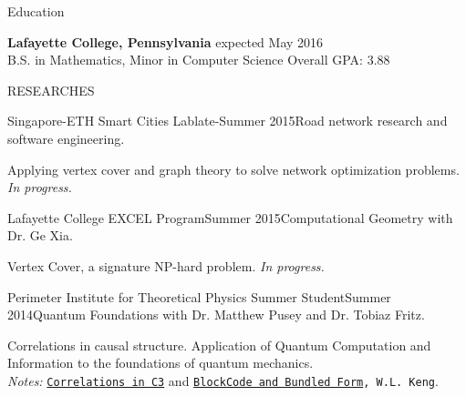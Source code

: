 \documentclass{resume} %
\begin{document}
\begin{rSection}{Education}

{\bf Lafayette College, Pennsylvania} \hfill expected May 2016\\ 
B.S. in Mathematics, Minor in Computer Science \hfill Overall GPA: 3.88
\end{rSection}


\begin{rSection}{RESEARCHES}

\begin{rSubsection}{Singapore-ETH Smart Cities Lab}{late-Summer 2015}{Road network research and software engineering.}{}
\item Applying vertex cover and graph theory to solve network optimization problems. {\em In progress.}
\end{rSubsection}

\begin{rSubsection}{Lafayette College EXCEL Program}{Summer 2015}{Computational Geometry with Dr. Ge Xia.}{}
\item Vertex Cover, a signature NP-hard problem. {\em In progress.}
\end{rSubsection}



\begin{rSubsection}{Perimeter Institute for Theoretical Physics Summer Student}{Summer 2014}{Quantum Foundations with Dr. Matthew Pusey and Dr. Tobiaz Fritz.}{}
\item Correlations in causal structure. Application of Quantum Computation and Information to the foundations of quantum mechanics. \\
{\em Notes:} {\tt \href{https://github.com/kengz/Quantum-Foundations-Correlations/blob/master/Keng%20Correlations%20in%20C3.pdf}{\textcolor{Cerulean}{Correlations in C3}}} and {\tt \href{https://github.com/kengz/Quantum-Foundations-Correlations/blob/master/Keng%20blockcode.pdf}{\textcolor{Cerulean}{BlockCode and Bundled Form}}, W.L. Keng}.
\end{rSubsection}


\end{rSection}
\end{document}
